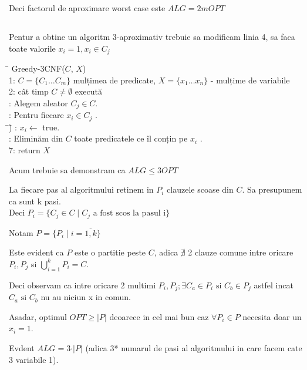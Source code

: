 \documentclass[a4paper]{report} %
\begin{document}
Deci factorul de aproximare worst case este $ALG=2mOPT$

\subsection{}

Pentur a obtine un algoritm 3-aproximativ trebuie sa modificam linia 4, sa faca toate valorile $x_{i}=1, x_{i} \in C_{j}$

\begin{tabbing}
\hspace{2em}\= \kill 
Greedy-3CNF($C$, $X$)\\
1: $C=\{C_{1}\dots C_{m}\}$ mulțimea de predicate, $X=\{x_{1}\dots x_{n}\}$ - mulțime de variabile\\ 
2: cât timp $C\neq \emptyset$ execută\\ 
: Alegem aleator $C_{j}\in C$.\\
: Pentru fiecare $x_{i} \in C_{j}$ .\\
\hspace{2em}\= \hspace{2em}\=)\kill 
\> : $x_{i}\leftarrow$ true.\\
\> : Eliminăm din $C$ toate predicatele ce îl conțin pe $x_{i}$ .\\
7: return $X$\\
\end{tabbing}

Acum trebuie sa demonstram ca $ALG\leq 3OPT$

La fiecare pas al algoritmului retinem in $P_{i}$ clauzele scoase din $C$. Sa presupunem ca sunt k pasi.\\

Deci $P_{i}=\{C_{j}\in C \mid C_{j}\text{ a fost scos la pasul i}\}$ 

Notam $P=\{P_{i} \mid i=\overline{1,k}\}$

Este evident ca $P$ este o partitie peste $C$, adica $\nexists$ 2 clauze comune intre oricare $P_{i}, P_{j}$ si $\bigcup\limits_{i=1}^{k} P_{i}=C$.

Deci observam ca intre oricare 2 multimi $P_{i}, P_{j}; \exists C_{a}\in P_{i} \text{ si } C_{b}\in P_{j}$ astfel incat $C_{a} \text{ si } C_{b}$ nu au niciun x in comun.

Asadar, optimul $OPT\geq \vert P\vert$ deoarece in cel mai bun caz $\forall P_{i}\in P$ necesita doar un $x_{i}=1$.

Evdent $ALG=3\cdot \vert P \vert$ (adica 3* numarul de pasi al algoritmului in care facem cate 3 variabile 1).
\end{document}
